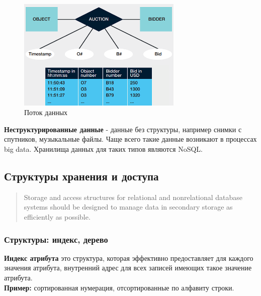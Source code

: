 \documentclass{article}
\begin{document}
\begin{figure}[h]
    \centering
    \includegraphics[width=0.7\textwidth]{images/datastream.png}
    \caption{Поток данных}
    \label{img1}
\end{figure}

\textbf{Неструктурированные данные} - данные без структуры, например снимки с спутников, музыкальные файлы. Чаще всего такие данные возникают в процессах big data. Хранилища данных для таких типов являются NoSQL.

\subsection{Структуры хранения и доступа}
\begin{quote}
    Storage and access structures for relational and nonrelational database systems should 
    be designed to manage data in secondary storage as efficiently as possible.
\end{quote}

\subsubsection{Структуры: индекс, дерево}
\textbf{Индекс атрибута} это структура, которая эффективно предоставляет для каждого значения атрибута, внутренний адрес для всех записей имеющих такое значение атрибута.\\
\textbf{Пример:} сортированная нумерация, отсортированные по алфавиту строки.\\
\end{document}
